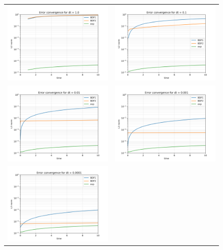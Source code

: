 \documentclass[11pt, spanish]{article}
\begin{document}
\begin{figure}[H]
    \centering
    \begin{tabular}{cc}
\includegraphics[width=0.5\linewidth]{res/homogeneo/L2norm_dt_1.0}
    &   \includegraphics[width=0.5\linewidth]{res/homogeneo/L2norm_dt_0.1}
        \\
\includegraphics[width=0.5\linewidth]{res/homogeneo/L2norm_dt_0.01}
    &   \includegraphics[width=0.5\linewidth]{res/homogeneo/L2norm_dt_0.001}
    \\
\includegraphics[width=0.5\linewidth]{res/homogeneo/L2norm_dt_0.0001}

\end{tabular}
\end{figure}
\end{document}
